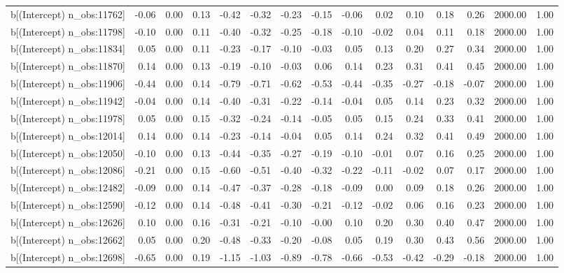 \begin{table}[ht]
\begin{tabular}{rrrrrrrrrrrrrrr}
  b[(Intercept) n\_obs:11762] & -0.06 & 0.00 & 0.13 & -0.42 & -0.32 & -0.23 & -0.15 & -0.06 & 0.02 & 0.10 & 0.18 & 0.26 & 2000.00 & 1.00 \\ 
  b[(Intercept) n\_obs:11798] & -0.10 & 0.00 & 0.11 & -0.40 & -0.32 & -0.25 & -0.18 & -0.10 & -0.02 & 0.04 & 0.11 & 0.18 & 2000.00 & 1.00 \\ 
  b[(Intercept) n\_obs:11834] & 0.05 & 0.00 & 0.11 & -0.23 & -0.17 & -0.10 & -0.03 & 0.05 & 0.13 & 0.20 & 0.27 & 0.34 & 2000.00 & 1.00 \\ 
  b[(Intercept) n\_obs:11870] & 0.14 & 0.00 & 0.13 & -0.19 & -0.10 & -0.03 & 0.06 & 0.14 & 0.23 & 0.31 & 0.41 & 0.45 & 2000.00 & 1.00 \\ 
  b[(Intercept) n\_obs:11906] & -0.44 & 0.00 & 0.14 & -0.79 & -0.71 & -0.62 & -0.53 & -0.44 & -0.35 & -0.27 & -0.18 & -0.07 & 2000.00 & 1.00 \\ 
  b[(Intercept) n\_obs:11942] & -0.04 & 0.00 & 0.14 & -0.40 & -0.31 & -0.22 & -0.14 & -0.04 & 0.05 & 0.14 & 0.23 & 0.32 & 2000.00 & 1.00 \\ 
  b[(Intercept) n\_obs:11978] & 0.05 & 0.00 & 0.15 & -0.32 & -0.24 & -0.14 & -0.05 & 0.05 & 0.15 & 0.24 & 0.33 & 0.41 & 2000.00 & 1.00 \\ 
  b[(Intercept) n\_obs:12014] & 0.14 & 0.00 & 0.14 & -0.23 & -0.14 & -0.04 & 0.05 & 0.14 & 0.24 & 0.32 & 0.41 & 0.49 & 2000.00 & 1.00 \\ 
  b[(Intercept) n\_obs:12050] & -0.10 & 0.00 & 0.13 & -0.44 & -0.35 & -0.27 & -0.19 & -0.10 & -0.01 & 0.07 & 0.16 & 0.25 & 2000.00 & 1.00 \\ 
  b[(Intercept) n\_obs:12086] & -0.21 & 0.00 & 0.15 & -0.60 & -0.51 & -0.40 & -0.32 & -0.22 & -0.11 & -0.02 & 0.07 & 0.17 & 2000.00 & 1.00 \\ 
  b[(Intercept) n\_obs:12482] & -0.09 & 0.00 & 0.14 & -0.47 & -0.37 & -0.28 & -0.18 & -0.09 & 0.00 & 0.09 & 0.18 & 0.26 & 2000.00 & 1.00 \\ 
  b[(Intercept) n\_obs:12590] & -0.12 & 0.00 & 0.14 & -0.48 & -0.41 & -0.30 & -0.21 & -0.12 & -0.02 & 0.06 & 0.16 & 0.23 & 2000.00 & 1.00 \\ 
  b[(Intercept) n\_obs:12626] & 0.10 & 0.00 & 0.16 & -0.31 & -0.21 & -0.10 & -0.00 & 0.10 & 0.20 & 0.30 & 0.40 & 0.47 & 2000.00 & 1.00 \\ 
  b[(Intercept) n\_obs:12662] & 0.05 & 0.00 & 0.20 & -0.48 & -0.33 & -0.20 & -0.08 & 0.05 & 0.19 & 0.30 & 0.43 & 0.56 & 2000.00 & 1.00 \\ 
  b[(Intercept) n\_obs:12698] & -0.65 & 0.00 & 0.19 & -1.15 & -1.03 & -0.89 & -0.78 & -0.66 & -0.53 & -0.42 & -0.29 & -0.18 & 2000.00 & 1.00 \\ 

\end{tabular}
\end{table}
